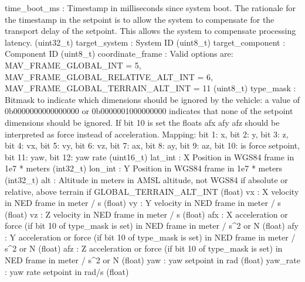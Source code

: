 \begin{DoxyVerb}
\begin{DoxyVerb}
\begin{DoxyVerb}
\begin{DoxyVerb}
\begin{DoxyVerb}
\begin{DoxyVerb}
\begin{DoxyVerb}
\begin{DoxyVerb}
\begin{DoxyVerb}
\begin{DoxyVerb}
\begin{DoxyVerb}
time_boot_ms              : Timestamp in milliseconds since system boot. The rationale for the timestamp in the setpoint is to allow the system to compensate for the transport delay of the setpoint. This allows the system to compensate processing latency. (uint32_t)
target_system             : System ID (uint8_t)
target_component          : Component ID (uint8_t)
coordinate_frame          : Valid options are: MAV_FRAME_GLOBAL_INT = 5, MAV_FRAME_GLOBAL_RELATIVE_ALT_INT = 6, MAV_FRAME_GLOBAL_TERRAIN_ALT_INT = 11 (uint8_t)
type_mask                 : Bitmask to indicate which dimensions should be ignored by the vehicle: a value of 0b0000000000000000 or 0b0000001000000000 indicates that none of the setpoint dimensions should be ignored. If bit 10 is set the floats afx afy afz should be interpreted as force instead of acceleration. Mapping: bit 1: x, bit 2: y, bit 3: z, bit 4: vx, bit 5: vy, bit 6: vz, bit 7: ax, bit 8: ay, bit 9: az, bit 10: is force setpoint, bit 11: yaw, bit 12: yaw rate (uint16_t)
lat_int                   : X Position in WGS84 frame in 1e7 * meters (int32_t)
lon_int                   : Y Position in WGS84 frame in 1e7 * meters (int32_t)
alt                       : Altitude in meters in AMSL altitude, not WGS84 if absolute or relative, above terrain if GLOBAL_TERRAIN_ALT_INT (float)
vx                        : X velocity in NED frame in meter / s (float)
vy                        : Y velocity in NED frame in meter / s (float)
vz                        : Z velocity in NED frame in meter / s (float)
afx                       : X acceleration or force (if bit 10 of type_mask is set) in NED frame in meter / s^2 or N (float)
afy                       : Y acceleration or force (if bit 10 of type_mask is set) in NED frame in meter / s^2 or N (float)
afz                       : Z acceleration or force (if bit 10 of type_mask is set) in NED frame in meter / s^2 or N (float)
yaw                       : yaw setpoint in rad (float)
yaw_rate                  : yaw rate setpoint in rad/s (float)\end{DoxyVerb}
 \mbox{\label{classpymavlink_1_1dialects_1_1v10_1_1MAVLink_aa9bbd66ea78d8ea7e4f7548dddb02baf}} 

\end{DoxyVerb}
\end{DoxyVerb}
\end{DoxyVerb}
\end{DoxyVerb}
\end{DoxyVerb}
\end{DoxyVerb}
\end{DoxyVerb}
\end{DoxyVerb}
\end{DoxyVerb}
\end{DoxyVerb}
